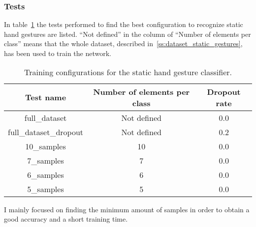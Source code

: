 \documentclass[../thesis.tex]{subfiles}
\begin{document}
\subsubsection{Tests}
In table~\ref{tab:tests_static_hand_gestures}  the tests performed to find the best configuration to recognize static hand gestures are listed. ``Not defined'' in the column of ``Number of elements per class'' means that the whole dataset, described in~\ref{ss:dataset_static_gestures}, has been used to train the network.
\begin{table}[H]
\begin{tabular}{|c|c|c|}
\hline
\textbf{Test name}          & \textbf{Number of elements per class} & \textbf{Dropout rate} \\ \hline
full\_dataset               & Not defined                           & 0.0                   \\ \hline
full\_dataset\_dropout & Not defined                           & 0.2                   \\ \hline
10\_samples                 & 10                                    & 0.0                   \\ \hline
7\_samples                  & 7                                     & 0.0                   \\ \hline
6\_samples                  & 6                                     & 0.0                   \\ \hline
5\_samples                  & 5                                     & 0.0                   \\ \hline
\end{tabular}
\caption{Training configurations for the static hand gesture classifier.}\label{tab:tests_static_hand_gestures}
\end{table}
I mainly focused on finding the minimum amount of samples in order to obtain a good accuracy and a short training time. 
\end{document}
